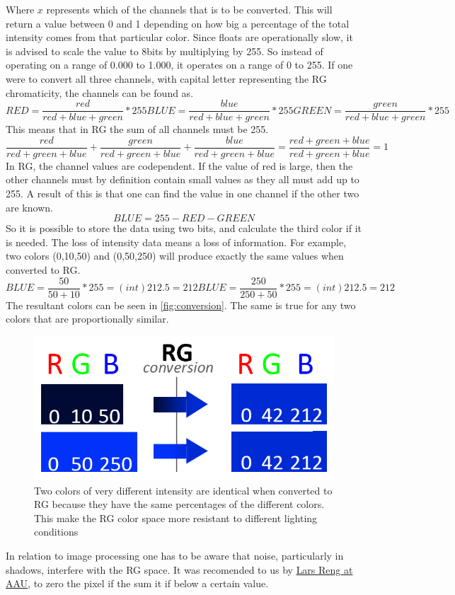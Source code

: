 Where $x$ represents which of the channels that is to be converted. This will return a value between 0 and 1 depending on how big a percentage of the total intensity comes from that particular color. Since floats are operationally slow, it is advised to scale the value to 8bits by multiplying by 255. So instead of operating on a range of 0.000 to 1.000, it operates on a range of 0 to 255. If one were to convert all three channels, with capital letter representing the RG chromaticity, the channels can be found as.
\begin{equation} 
RED = \frac{red}{red + blue + green} * 255
BLUE = \frac{blue}{red + blue + green} * 255
GREEN = \frac{green}{red + blue + green} * 255
\end{equation} 
This means that in RG the sum of all channels must be 255.
\begin{equation} 
\frac{red}{red + green + blue} + \frac{green}{red + green + blue} +  \frac{blue}{red + green + blue} =  \frac{red + green + blue}{red + green + blue} = 1
\end{equation} 
In RG, the channel values are codependent. If the value of red is large, then the other channels must by definition contain small values as they all must add up to 255. A result of this is that one can find the value in one channel if the other two are known.
\begin{equation} 
BLUE = 255 - RED - GREEN
\end{equation} 
So it is possible to store the data using two bits, and calculate the third color if it is needed. The loss of intensity data\cite{NormRGB} means a loss of information. For example, two colors (0,10,50) and (0,50,250) will produce exactly the same values when converted to RG.
\begin{equation} 
BLUE = \frac{50}{50 + 10} * 255 = (int)212.5 = 212 
BLUE = \frac{250}{250 + 50} * 255 = (int)212.5 = 212 
\end{equation} 
The resultant colors can be seen in \autoref{fig:conversion}. The same is true for any two colors that are proportionally similar.\\
\begin{figure}[H]
	\centering
	\includegraphics[width=0.6\linewidth]{figure/Analysis/rgconversion.png}
	\caption{Two colors of very different intensity are identical when converted to RG because they have the same percentages of the different colors. This make the RG color space more resistant to different lighting conditions}
	\label{fig:conversion}
\end{figure} 
In relation to image processing one has to be aware that noise, particularly in shadows, interfere with the RG space. It was recomended to us by \href{http://personprofil.aau.dk/109196}{Lars Reng at AAU},  to zero the pixel if the sum it if below a certain value.

